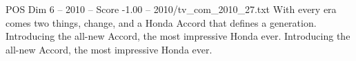 \begin{textsample}{POS Dim 6 – 2010 – Score -1.00 – 2010/tv\_com\_2010\_27.txt}  \label{ex:f6_pos_070}
With every era comes two things, change, and a Honda Accord that defines a generation.
Introducing the all-new Accord, the most impressive Honda ever.
Introducing the all-new Accord, the most impressive Honda ever.

\end{textsample}
